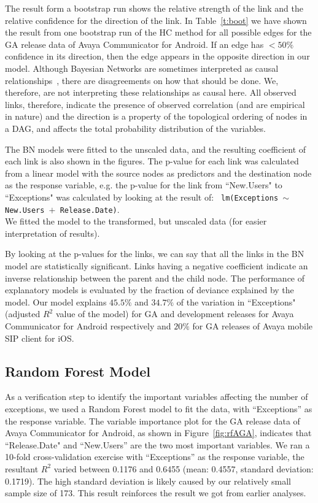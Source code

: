 \documentclass[smallextended]{svjour3}       %
\begin{document}
The result form a bootstrap run shows the relative strength of the
link and the relative confidence for the direction of the link. 
In Table~\ref{t:boot} we have shown the result from one bootstrap run of the HC method for all possible edges for the GA release data of Avaya Communicator for Android. If an edge has $<50\%$ confidence in its direction, then the edge appears in the opposite direction in our model.
Although Bayesian Networks are sometimes interpreted as causal relationships~\cite{pearl2011bayesian}, there are disagreements on how that should be done.
We, therefore, are not interpreting these relationships as causal here. All observed links, therefore, indicate the presence of observed correlation (and are empirical in nature) and the direction is a property of the topological ordering of nodes in a DAG, and affects the total probability distribution of the variables.

The BN models were fitted to
the unscaled data, and the resulting coefficient of each link is also shown
in the figures. The p-value for each link was calculated from a
linear model with the source nodes as predictors and the destination
node as the response variable, e.g. the p-value for the link from
``New.Users" to ``Exceptions" was calculated by looking at the
result of:  \texttt{  lm(Exceptions $\sim$ New.Users $+$ Release.Date)}. \\
We fitted the model to the transformed, but unscaled data (for easier interpretation of results). 

By looking at the p-values for the links, we can say that all the links in the BN model
are statistically significant. 
Links having a negative coefficient indicate an inverse relationship between the parent 
and the child node.
The performance of explanatory models is evaluated by the fraction
of deviance explained by the model. Our model explains $45.5\%$ and $34.7\%$ of the
variation in ``Exceptions" (adjusted $R^2$ value of the model) for GA and development releases for Avaya Communicator for Android respectively and $20\%$ for GA releases of Avaya mobile SIP client for iOS. 


\subsection{Random Forest Model}
As a verification step to identify the important variables affecting the number of exceptions, we used a Random Forest model to fit the data, with ``Exceptions'' as the response variable. The variable importance plot for the GA release data of Avaya Communicator for Android, as shown in Figure~\ref{fig:rfAGA}, indicates that ``Release.Date" and ``New.Users'' are the two most important variables. We ran a 10-fold cross-validation exercise with ``Exceptions'' as the response variable, the resultant $R^2$ varied between 0.1176 and 0.6455 (mean: 0.4557, standard deviation: 0.1719). The high standard deviation is likely caused by our relatively small sample size of 173. This result reinforces the result we got from earlier analyses.
\end{document}
